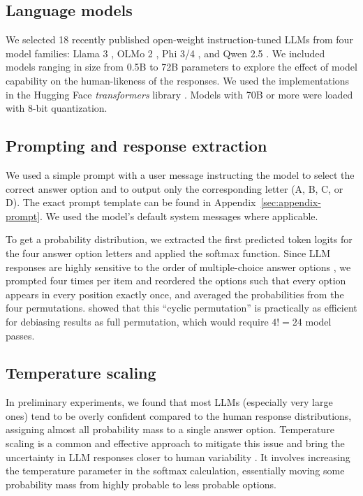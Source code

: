 \documentclass[11pt]{article}
\begin{document}
\subsection{Language models}

We selected 18 recently published open-weight instruction-tuned LLMs from four model families: Llama 3 \citep{Grattafiori2024}, OLMo 2 \citep{OLMo2025}, Phi 3/4 \citep{Abdin2024,Abdin2024a}, and Qwen 2.5 \citep{Qwen2024}. We included models ranging in size from 0.5B to 72B parameters to explore the effect of model capability on the human-likeness of the responses. We used the implementations in the Hugging Face \emph{transformers} library \citep{Wolf2020}. Models with 70B or more were loaded with 8-bit quantization.

\subsection{Prompting and response extraction}

We used a simple prompt with a user message instructing the model to select the correct answer option and to output only the corresponding letter (A, B, C, or D). The exact prompt template can be found in Appendix~\ref{sec:appendix-prompt}. We used the model's default system messages where applicable.

To get a probability distribution, we extracted the first predicted token logits for the four answer option letters and applied the softmax function. Since LLM responses are highly sensitive to the order of multiple-choice answer options \citep{Wang2024,Zheng2024,Pezeshkpour2024}, we prompted four times per item and reordered the options such that every option appears in every position exactly once, and averaged the probabilities from the four permutations. \citet{Zheng2024} showed that this ``cyclic permutation'' is practically as efficient for debiasing results as full permutation, which would require $4! = 24$ model passes.

\subsection{Temperature scaling}
\label{sec:experiment:temperature-scaling}

In preliminary experiments, we found that most LLMs (especially very large ones) tend to be overly confident compared to the human response distributions, assigning almost all probability mass to a single answer option. Temperature scaling is a common and effective approach to mitigate this issue and bring the uncertainty in LLM responses closer to human variability \citep{Guo2017,Baan2022,Chen2024}. It involves increasing the temperature parameter in the softmax calculation, essentially moving some probability mass from highly probable to less probable options.
\end{document}
